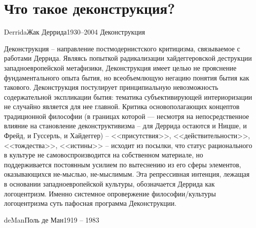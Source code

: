 \documentclass[aspectratio=169]{beamer}
\begin{document}
\section{Что такое деконструкция?}

\begin{Person}{Derrida}{Жак Деррида}{1930--2004}
Деконструкция  
\end{Person}

\begin{frame}
Деконструкция -- направление постмодернистского критицизма, связываемое с работами Деррида. Являясь попыткой радикализации хайдеггеровской деструкции западноевропейской метафизики, Деконструкция имеет целью не прояснение фундаментального опыта бытия, но всеобъемлющую негацию понятия бытия как такового. Деконструкция постулирует принципиальную невозможность содержательной экспликации бытия: тематика субъективирующей интериоризации не случайно является для нее главной. Критика основополагающих концептов традиционной философии (в границах которой — несмотря на непосредственное влияние на становление деконструктивизма -- для Деррида остаются и Ницше, и Фрейд, и Гуссерль, и Хайдеггер) -- <<присутствия>>, <<действительности>>, <<тождества>>, <<истины>> -- исходит из посылки, что статус рационального в культуре не самовоспроизводится на собственном материале, но поддерживается постоянным усилием по вытеснению из его сферы элементов, оказывающихся не-мыслью, не-мыслимым. Эта репрессивная интенция, лежащая в основании западноевропейской культуры, обозначается Деррида как логоцентризм. Именно системное опровержение философии/культуры логоцентризма суть пафосная  программа Деконструкции.
\end{frame}

\begin{Person}{deMan}{Поль де Ман}{1919 -- 1983}
\end{Person}

\end{document}
